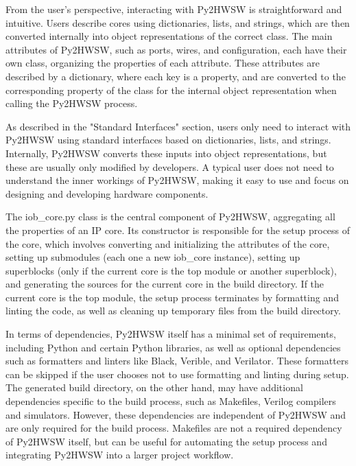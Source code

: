 %


From the user's perspective, interacting with Py2HWSW is straightforward and intuitive. Users describe cores using dictionaries, lists, and strings, which are then converted internally into object representations of the correct class. The main attributes of Py2HWSW, such as ports, wires, and configuration, each have their own class, organizing the properties of each attribute. These attributes are described by a dictionary, where each key is a property, and are converted to the corresponding property of the class for the internal object representation when calling the Py2HWSW process.

As described in the "Standard Interfaces" section, users only need to interact with Py2HWSW using standard interfaces based on dictionaries, lists, and strings. Internally, Py2HWSW converts these inputs into object representations, but these are usually only modified by developers. A typical user does not need to understand the inner workings of Py2HWSW, making it easy to use and focus on designing and developing hardware components.

The iob_core.py class is the central component of Py2HWSW, aggregating all the properties of an IP core. Its constructor is responsible for the setup process of the core, which involves converting and initializing the attributes of the core, setting up submodules (each one a new iob_core instance), setting up superblocks (only if the current core is the top module or another superblock), and generating the sources for the current core in the build directory. If the current core is the top module, the setup process terminates by formatting and linting the code, as well as cleaning up temporary files from the build directory.

In terms of dependencies, Py2HWSW itself has a minimal set of requirements, including Python and certain Python libraries, as well as optional dependencies such as formatters and linters like Black, Verible, and Verilator. These formatters can be skipped if the user chooses not to use formatting and linting during setup. The generated build directory, on the other hand, may have additional dependencies specific to the build process, such as Makefiles, Verilog compilers and simulators. However, these dependencies are independent of Py2HWSW and are only required for the build process. Makefiles are not a required dependency of Py2HWSW itself, but can be useful for automating the setup process and integrating Py2HWSW into a larger project workflow. 
